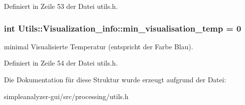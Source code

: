 Definiert in Zeile 53 der Datei utils.\-h.

\hypertarget{structUtils_1_1Visualization__info_a6e192352d1f00709f8ef963206ff2653}{
\subsubsection[{min\-\_\-visualisation\-\_\-temp}]{\setlength{\rightskip}{0pt plus 5cm}int Utils\-::\-Visualization\-\_\-info\-::min\-\_\-visualisation\-\_\-temp = 0}}\label{structUtils_1_1Visualization__info_a6e192352d1f00709f8ef963206ff2653}
minimal Visualisierte Temperatur (entspricht der Farbe Blau). 

Definiert in Zeile 54 der Datei utils.\-h.



Die Dokumentation für diese Struktur wurde erzeugt aufgrund der Datei\-:\begin{DoxyCompactItemize}
\item 
simpleanalyzer-\/gui/src/processing/utils.\-h\end{DoxyCompactItemize}
